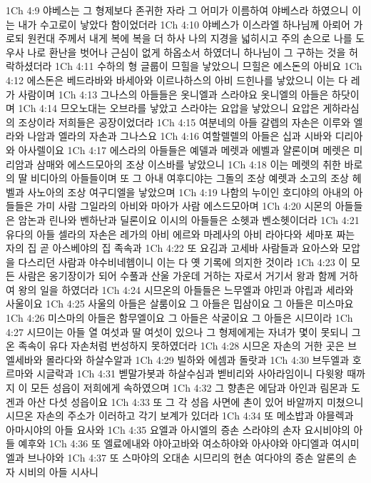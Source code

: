 1Ch 4:9  야베스는 그 형제보다 존귀한 자라 그 어미가 이름하여 야베스라 하였으니 이는 내가 수고로이 낳았다 함이었더라
1Ch 4:10  야베스가 이스라엘 하나님께 아뢰어 가로되 원컨대 주께서 내게 복에 복을 더 하사 나의 지경을 넓히시고 주의 손으로 나를 도우사 나로 환난을 벗어나 근심이 없게 하옵소서 하였더니 하나님이 그 구하는 것을 허락하셨더라
1Ch 4:11  수하의 형 글룹이 므힐을 낳았으니 므힐은 에스돈의 아비요
1Ch 4:12  에스돈은 베드라바와 바세아와 이르나하스의 아비 드힌나를 낳았으니 이는 다 레가 사람이며
1Ch 4:13  그나스의 아들들은 옷니엘과 스라야요 옷니엘의 아들은 하닷이며
1Ch 4:14  므오노대는 오브라를 낳았고 스라야는 요압을 낳았으니 요압은 게하라심의 조상이라 저희들은 공장이었더라
1Ch 4:15  여분네의 아들 갈렙의 자손은 이루와 엘라와 나암과 엘라의 자손과 그나스요
1Ch 4:16  여할렐렐의 아들은 십과 시바와 디리아와 아사렐이요
1Ch 4:17  에스라의 아들들은 예델과 메렛과 에벨과 얄론이며 메렛은 미리암과 삼매와 에스드모아의 조상 이스바를 낳았으니
1Ch 4:18  이는 메렛의 취한 바로의 딸 비디아의 아들들이며 또 그 아내 여후디야는 그돌의 조상 예렛과 소고의 조상 헤벨과 사노아의 조상 여구디엘을 낳았으며
1Ch 4:19  나함의 누이인 호디야의 아내의 아들들은 가미 사람 그일라의 아비와 마아가 사람 에스드모아며
1Ch 4:20  시몬의 아들들은 암논과 린나와 벤하난과 딜론이요 이시의 아들들은 소헷과 벤소헷이더라
1Ch 4:21  유다의 아들 셀라의 자손은 레가의 아비 에르와 마레사의 아비 라아다와 세마포 짜는 자의 집 곧 아스베야의 집 족속과
1Ch 4:22  또 요김과 고세바 사람들과 요아스와 모압을 다스리던 사람과 야수비네헴이니 이는 다 옛 기록에 의지한 것이라
1Ch 4:23  이 모든 사람은 옹기장이가 되어 수풀과 산울 가운데 거하는 자로서 거기서 왕과 함께 거하여 왕의 일을 하였더라
1Ch 4:24  시므온의 아들들은 느무엘과 야민과 야립과 세라와 사울이요
1Ch 4:25  사울의 아들은 살룸이요 그 아들은 밉삼이요 그 아들은 미스마요
1Ch 4:26  미스마의 아들은 함무엘이요 그 아들은 삭굴이요 그 아들은 시므이라
1Ch 4:27  시므이는 아들 열 여섯과 딸 여섯이 있으나 그 형제에게는 자녀가 몇이 못되니 그 온 족속이 유다 자손처럼 번성하지 못하였더라
1Ch 4:28  시므온 자손의 거한 곳은 브엘세바와 몰라다와 하살수알과
1Ch 4:29  빌하와 에셈과 돌랏과
1Ch 4:30  브두엘과 호르마와 시글락과
1Ch 4:31  벧말가봇과 하살수심과 벧비리와 사아라임이니 다윗왕 때까지 이 모든 성읍이 저희에게 속하였으며
1Ch 4:32  그 향촌은 에담과 아인과 림몬과 도겐과 아산 다섯 성읍이요
1Ch 4:33  또 그 각 성읍 사면에 촌이 있어 바알까지 미쳤으니 시므온 자손의 주소가 이러하고 각기 보계가 있더라
1Ch 4:34  또 메소밥과 야믈렉과 아마시야의 아들 요사와
1Ch 4:35  요엘과 아시엘의 증손 스라야의 손자 요시비야의 아들 예후와
1Ch 4:36  또 엘료에내와 야아고바와 여소하야와 아사야와 아디엘과 여시미엘과 브나야와
1Ch 4:37  또 스마야의 오대손 시므리의 현손 여다야의 증손 알론의 손자 시비의 아들 시사니
